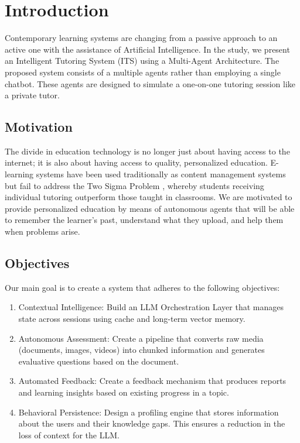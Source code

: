 \documentclass[conference]{IEEEtran}
\begin{document}
\begin{IEEEkeywords}
\lipsum[2][1]
\end{IEEEkeywords}

\section{Introduction}
Contemporary learning systems are changing from a passive approach to an active one with the assistance of Artificial Intelligence. In the study, we present an Intelligent Tutoring System (ITS) using a Multi-Agent Architecture. The proposed system consists of a multiple agents rather than employing a single chatbot. These agents are designed to simulate a one-on-one tutoring session like a private tutor.

\subsection{Motivation}
The divide in education technology is no longer just about having access to the internet; it is also about having access to quality, personalized education. E-learning systems have been used traditionally as content management systems but fail to address the Two Sigma Problem \cite{bloom1984}, whereby students receiving individual tutoring outperform those taught in classrooms. We are motivated to provide personalized education by means of autonomous agents that will be able to remember the learner’s past, understand what they upload, and help them when problems arise.

\subsection{Objectives}
Our main goal is to create a system that adheres to the following objectives:
\begin{enumerate}
	\item Contextual Intelligence: Build an LLM Orchestration Layer that manages state across sessions using cache and long-term vector memory.
	\item Autonomous Assessment: Create a pipeline that converts raw media (documents, images, videos) into chunked information and generates evaluative questions based on the document.
	\item Automated Feedback: Create a feedback mechanism that produces reports and learning insights based on existing progress in a topic.
	\item Behavioral Persistence: Design a profiling engine that stores information about the users and their knowledge gaps. This ensures a reduction in the loss of context for the LLM.
\end{enumerate}
\end{document}
